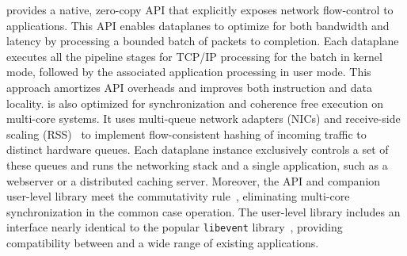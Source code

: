 \ix provides a native, zero-copy API that explicitly exposes network
flow-control to applications.  This API enables dataplanes to optimize
for both bandwidth and latency by processing a bounded batch of
packets to completion.  Each dataplane executes all the pipeline
stages for TCP/IP processing for the batch in kernel mode, followed by
the associated application processing in user mode. This approach
amortizes API overheads and improves both instruction and data
locality.  \ix is also optimized for synchronization and coherence
free execution on multi-core systems. It uses multi-queue network
adapters (NICs) and receive-side scaling (RSS)~\cite{url:rss} to
implement flow-consistent hashing of incoming traffic to distinct
hardware queues. Each dataplane instance exclusively controls a set of
these queues and runs the networking stack and a single application,
such as a webserver or a distributed caching server. Moreover, the \ix
API and companion user-level library meet the commutativity
rule~\cite{DBLP:conf/sosp/ClementsKZMK13}, eliminating multi-core
synchronization in the common case operation. The \ix user-level
library includes an interface nearly identical to the popular
\texttt{libevent} library~\cite{provos2003libevent}, providing
compatibility between \ix and a wide range of existing applications.




